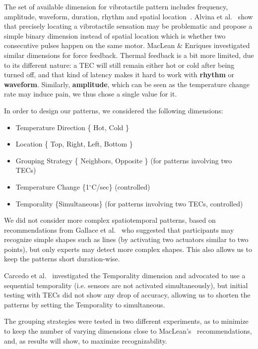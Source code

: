 \documentclass[preprint,12pt]{elsarticle}
\begin{document}
The set of available dimension for vibrotactile pattern includes frequency, amplitude, waveform, duration, rhythm and spatial location~\cite{Brown2005,Chan2008,MacLean2008}. Alvina et al.~\cite{Alvina2015} show that precisely locating a vibrotactile sensation may be problematic and propose a simple binary dimension instead of spatial location which is whether two consecutive pulses happen on the same motor.
MacLean \& Enriques investigated similar dimensions for force feedback.
Thermal feedback is a bit more limited, due to its different nature: a TEC will still remain either hot or cold after being turned off, and that kind of latency makes it hard to work with \textbf{rhythm} or \textbf{waveform}.
Similarly, \textbf{amplitude}, which can be seen as the temperature change rate may induce pain, we thus chose a single value for it.

In order to design our patterns, we considered the following dimensions:
\begin{itemize}
\item Temperature Direction \{ Hot, Cold \}
\item Location \{ Top, Right, Left, Bottom \}
\item Grouping Strategy \{ Neighbors, Opposite \} (for patterns involving two TECs)
\item Temperature Change \{1$^\circ$C/sec\} (controlled)
\item Temporality \{Simultaneous\} (for patterns involving two TECs, controlled)
\end{itemize}

We did not consider more complex spatiotemporal patterns, based on recommendations from Gallace et al.~\cite{Gallace2007} who suggested that participants may recognize simple shapes such as lines (by activating two actuators similar to two points), but only experts may detect more complex shapes. This also allows us to keep the patterns short duration-wise.

Carcedo et al.~\cite{1} investigated the Temporality dimension and advocated to use a sequential temporality (i.e. sensors are not activated simultaneously), but initial testing with TECs did not show any drop of accuracy, allowing us to shorten the patterns by setting the Temporality to simultaneous.

The grouping strategies were tested in two different experiments, as to minimize to keep the number of varying dimensions close to MacLean's~\cite{MacLean2008} recommendations, and, as results will show, to maximize recognizability.
\end{document}
